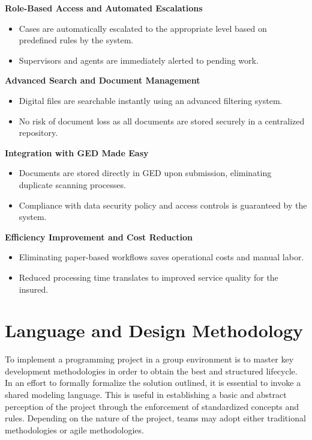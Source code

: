 \textbf{ Role-Based Access and Automated Escalations}
\begin{itemize}
    \item Cases are automatically escalated to the appropriate level based on predefined rules by the system.
    \item Supervisors and agents are immediately alerted to pending work.
\end{itemize}

 \textbf{ Advanced Search and Document Management}
\begin{itemize}
    \item Digital files are searchable instantly using an advanced filtering system.
    \item No risk of document loss as all documents are stored securely in a centralized repository. 
\end{itemize}

\textbf{ Integration with GED Made Easy}
\begin{itemize}
\item Documents are stored directly in GED upon submission, eliminating duplicate scanning processes.
\item Compliance with data security policy and access controls is guaranteed by the system.
\end{itemize}

 \textbf{ Efficiency Improvement and Cost Reduction}
\begin{itemize}
    \item Eliminating paper-based workflows saves operational costs and manual labor.
    \item Reduced processing time translates to improved service quality for the insured.
\end{itemize}

\section{Language and Design Methodology}

To implement a programming project in a group environment is to master key development methodologies in order to obtain the best and structured lifecycle.
In an effort to formally formalize the solution outlined, it is essential to invoke a shared modeling language. This is useful in establishing a basic and abstract perception of the project through the enforcement of standardized concepts and rules.
Depending on the nature of the project, teams may adopt either traditional methodologies or agile methodologies.

